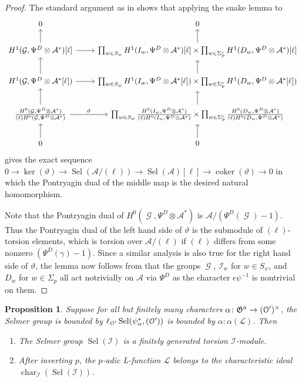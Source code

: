 \documentclass[leqno]{amsart}
\newtheorem{prop}[thm]{Proposition}
\theoremstyle{definition}
\theoremstyle{remark}
\newcommand{\eo}{\EuScript{O}}
\DeclareMathOperator{\coker}{coker}
\DeclareMathOperator{\Gal}{\mathcal{G}}
\newcommand{\fG}{\mathfrak{G}}
\newcommand{\I}{\mathcal{I}} %
\DeclareMathOperator{\Sel}{Sel}
\DeclareMathOperator{\car}{char}
\begin{document}
\begin{proof}
The standard argument as in \cite[Prop 2.6]{Hsieh2010}
shows that applying the snake lemma to 
\[
\begin{tikzcd}
0 & 0\\
H^1(\Gal,\Psi^D\otimes \mathcal{A}^*)[\ell] \arrow[u]\arrow[r] &
\prod_{w\in S_\psi}
H^1(I_w,\Psi^D\otimes \mathcal{A}^*)[\ell]\times
\prod_{w\in\Sigma_p^c}
H^1(D_w,\Psi^D\otimes \mathcal{A}^*)[\ell] \arrow[u]\\
H^1(\Gal,\Psi^D\otimes \mathcal{A}^*[\ell]) \arrow[u]\arrow[r] &
\prod_{w\in S_\psi}
H^1(I_w,\Psi^D\otimes \mathcal{A}^*[\ell])\times
\prod_{w\in\Sigma_p^c}
H^1(D_w,\Psi^D\otimes \mathcal{A}^*[\ell]) \arrow[u]\\
\frac{H^0(\Gal,\Psi^D\otimes\mathcal{A}^*)}
{(\ell)H^0(\Gal,\Psi^D\otimes\mathcal{A}^*)}
\arrow[u]\arrow[r,"\vartheta"] &
\prod_{w\in S_\psi}
\frac{H^0(I_w,\Psi^D\otimes\mathcal{A}^*)}
{(\ell)H^0(I_w,\Psi^D\otimes\mathcal{A}^*)}\times
\prod_{w\in\Sigma_p^c}
\frac{H^0(D_w,\Psi^D\otimes\mathcal{A}^*)}
{(\ell)H^0(D_w,\Psi^D\otimes\mathcal{A}^*)} \arrow[u]\\
0\arrow[u] & 
0\arrow[u]
\end{tikzcd}
\]
gives the exact sequence
$0\to \ker(\vartheta)\to \Sel(\mathcal{A}/(\ell))
\to \Sel(\mathcal{A})[\ell] \to \coker(\vartheta)\to 0$
in which the Pontryagin dual of the middle map
is the desired natural homomorphism.

Note that the Pontryagin dual of $H^0(\Gal,\Psi^D\otimes\mathcal{A}^*)$
is $\mathcal{A}/(\Psi^D(\Gal)-1)$.
Thus the Pontryagin dual of the left hand side of $\vartheta$
is the submodule of $(\ell)$-torsion elements,
which is torsion over $\mathcal{A}/(\ell)$
if $(\ell)$ differs from some
nonzero $(\Psi^D(\gamma)-1)$.
Since a similar analysis is also true 
for the right hand side of $\vartheta$,
the lemma now follows from that the groups
$\Gal$, $\I_w$ for $w\in S_\psi$, and $D_w$ for $w\in\Sigma_p$
all act notrivially on $\mathcal{A}$ via $\Psi^D$
as the character $\epsilon\psi^{-1}$ is nontrivial on them.
\end{proof}



\begin{prop}
Suppose for all but finitely many characters
$\alpha\colon \fG^a\to (\eo')^\times$,
the Selmer group is bounded by 
$\ell_{\eo'}\Sel(\psi_\alpha^*,(\eo'))$ 
is bounded by $\alpha\colon \alpha(\mathcal{L})$.
Then 
\begin{enumerate}
\item The Selmer group $\Sel(\I)$ is a finitely generated
torsion $\I$-module.
\item After inverting $p$, the $p$-adic L-function
$\mathcal{L}$ belongs to the characteristic ideal
$\car_{\I}(\Sel(\I))$.
\end{enumerate}
\end{prop}
\end{document}

